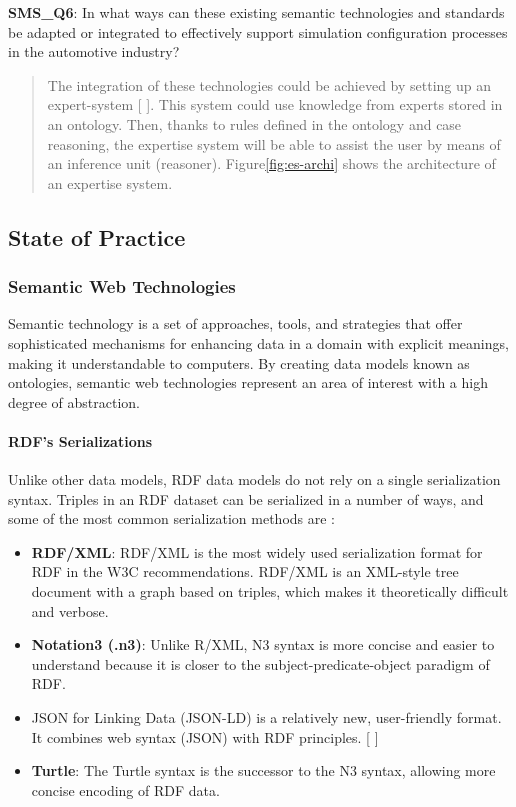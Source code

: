             \textbf{SMS\_Q6}: In what ways can these existing semantic technologies and standards be adapted or integrated to effectively support simulation configuration processes in the automotive industry?
            \begin{quote}
                The integration of these technologies could be achieved by setting up an expert-system [ ]. This system could use knowledge from experts stored in an ontology. Then, thanks to rules defined in the ontology and case reasoning, the expertise system will be able to assist the user by means of an inference unit (reasoner).  Figure\ref{fig:es-archi} shows the architecture of an expertise system.\\
            \end{quote}
        
    \subsection{State of Practice}
        \subsubsection{Semantic Web Technologies\label{sec:semtec}}
        Semantic technology is a set of approaches, tools, and strategies that offer sophisticated mechanisms for enhancing data in a domain with explicit meanings, making it understandable to computers. By creating data models known as ontologies, semantic web technologies represent an area of interest with a high degree of abstraction.\\ 
        
            \paragraph{RDF's Serializations}
                Unlike other data models, RDF data models do not rely on a single serialization syntax. Triples in an RDF dataset can be serialized in a number of ways, and some of the most common serialization methods are : 

                \begin{itemize}
                    \item \textbf{RDF/XML}: RDF/XML is the most widely used serialization format for RDF in the W3C recommendations. RDF/XML is an XML-style tree document with a graph based on triples, which makes it theoretically difficult and verbose. 
                    \item \textbf{Notation3 (.n3)}: Unlike R/XML, N3 syntax is more concise and easier to understand because it is closer to the subject-predicate-object paradigm of RDF. 
                    \item JSON for Linking Data (JSON-LD) is a relatively new, user-friendly format. It combines web syntax (JSON) with RDF principles. [ ] 
                    \item \textbf{Turtle}: The Turtle syntax is the successor to the N3 syntax, allowing more concise encoding of RDF data.
                \end{itemize}

